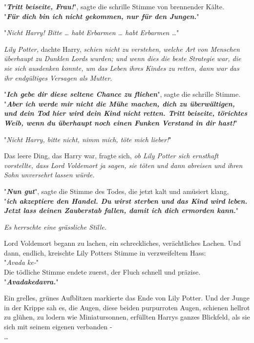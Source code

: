 {"\textbf{\emph{Tritt beiseite, Frau!}}", sagte die schrille Stimme von brennender Kälte.\\ "\textbf{\emph{Für dich bin ich nicht gekommen, nur für den Jungen.}}"

"\emph{Nicht Harry! Bitte … habt Erbarmen … habt Erbarmen …}"

\emph{Lily Potter,} dachte Harry, \emph{schien nicht zu verstehen, welche Art von Menschen überhaupt zu Dunklen Lords wurden; und wenn dies die beste Strategie war, die sie sich ausdenken konnte, um das Leben ihres Kindes zu retten, dann war das ihr endgültiges Versagen als Mutter}.

"\textbf{\emph{Ich gebe dir diese seltene Chance zu fliehen}}", sagte die schrille Stimme.\\ "\textbf{\emph{Aber ich werde mir nicht die Mühe machen, dich zu überwältigen, und dein Tod hier wird dein Kind nicht retten. Tritt beiseite, törichtes Weib, wenn du überhaupt noch einen Funken Verstand in dir hast!}}"

"\emph{Nicht Harry, bitte nicht, nimm mich, töte mich lieber!}"

Das leere Ding, das Harry war, fragte sich, \emph{ob Lily Potter sich ernsthaft vorstellte, dass Lord Voldemort ja sagen, sie töten und dann abreisen und ihren Sohn unversehrt lassen würde.}

"\textbf{\emph{Nun gut}}", sagte die Stimme des Todes, die jetzt kalt und amüsiert klang,\\ "\textbf{\emph{ich akzeptiere den Handel. Du wirst sterben und das Kind wird leben. Jetzt lass deinen Zauberstab fallen, damit ich dich ermorden kann.}}"

\emph{Es herrschte eine grässliche Stille.}

Lord Voldemort begann zu lachen, ein schreckliches, verächtliches Lachen. Und dann, endlich, kreischte Lily Potters Stimme in verzweifeltem Hass:\\ "\emph{Avada ke-}"\\ Die tödliche Stimme endete zuerst, der Fluch schnell und präzise.\\ "\textbf{\emph{Avadakedavra.}}"

Ein grelles, grünes Aufblitzen markierte das Ende von Lily Potter. Und der Junge in der Krippe sah es, die Augen, diese beiden purpurroten Augen, schienen hellrot zu glühen, zu lodern wie Miniatursonnen, erfüllten Harrys ganzes Blickfeld, als sie sich mit seinem eigenen verbanden -\\ …

}
